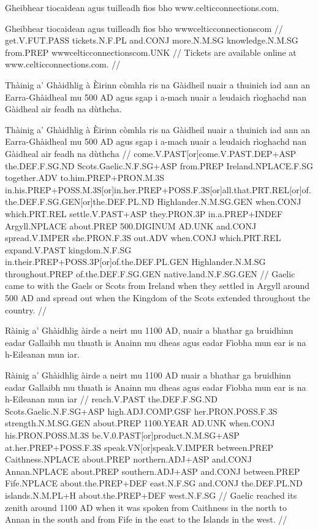\documentclass[a4paper,10pt]{article}
\begin{document}
\ex
\begingl
\glpre Gheibhear tiocaidean agus tuilleadh fios bho www.celticconnections.com. 

\vspace{4mm}
\gla Gheibhear tiocaidean agus tuilleadh fios bho wwwcelticconnectionscom  //
\glb get.V.FUT.PASS tickets.N.F.PL and.CONJ more.N.M.SG knowledge.N.M.SG from.PREP wwwcelticconnectionscom.UNK  //
\glft Tickets are available online at www.celticconnections.com. //
\endgl
\xe

\ex
\begingl
\glpre Thàinig a' Ghàidhlig à Èirinn còmhla ris na Gàidheil nuair a thuinich iad ann an Earra-Ghàidheal mu 500 AD agus sgap i a-mach nuair a leudaich rìoghachd nan Gàidheal air feadh na dùthcha. 

\vspace{4mm}
\gla Thàinig a' Ghàidhlig à Èirinn còmhla ris na Gàidheil nuair a thuinich iad {ann an} Earra-Ghàidheal mu 500 AD agus sgap i a-mach nuair a leudaich rìoghachd nan Gàidheal {air feadh} na dùthcha  //
\glb come.V.PAST[or]come.V.PAST.DEP+ASP the.DEF.F.SG.ND Scots.Gaelic.N.F.SG+ASP from.PREP Ireland.NPLACE.F.SG together.ADV to.him.PREP+PRON.M.3S in.his.PREP+POSS.M.3S[or]in.her.PREP+POSS.F.3S[or]all.that.PRT.REL[or]of.the.DEF.F.SG.GEN[or]the.DEF.PL.ND Highlander.N.M.SG.GEN when.CONJ which.PRT.REL settle.V.PAST+ASP they.PRON.3P in.a.PREP+INDEF Argyll.NPLACE about.PREP 500.DIGINUM AD.UNK and.CONJ spread.V.IMPER she.PRON.F.3S out.ADV when.CONJ which.PRT.REL expand.V.PAST kingdom.N.F.SG in.their.PREP+POSS.3P[or]of.the.DEF.PL.GEN Highlander.N.M.SG throughout.PREP of.the.DEF.F.SG.GEN native.land.N.F.SG.GEN  //
\glft Gaelic came to with the Gaels or Scots from Ireland when they settled in Argyll around 500 AD and spread out when the Kingdom of the Scots extended throughout the country. //
\endgl
\xe

\ex
\begingl
\glpre Ràinig a' Ghàidhlig àirde a neirt mu 1100 AD, nuair a bhathar ga bruidhinn eadar Gallaibh mu thuath is Anainn mu dheas agus eadar Fìobha mun ear is na h-Eileanan mun iar. 

\vspace{4mm}
\gla Ràinig a' Ghàidhlig àirde a neirt mu 1100 AD nuair a bhathar ga bruidhinn eadar Gallaibh mu thuath is Anainn mu dheas agus eadar Fìobha mun ear is na h-Eileanan mun iar  //
\glb reach.V.PAST the.DEF.F.SG.ND Scots.Gaelic.N.F.SG+ASP high.ADJ.COMP.GSF her.PRON.POSS.F.3S strength.N.M.SG.GEN about.PREP 1100.YEAR AD.UNK when.CONJ his.PRON.POSS.M.3S be.V.0.PAST[or]product.N.M.SG+ASP at.her.PREP+POSS.F.3S speak.VN[or]speak.V.IMPER between.PREP Caithness.NPLACE about.PREP northern.ADJ+ASP and.CONJ Annan.NPLACE about.PREP southern.ADJ+ASP and.CONJ between.PREP Fife.NPLACE about.the.PREP+DEF east.N.F.SG and.CONJ the.DEF.PL.ND islands.N.M.PL+H about.the.PREP+DEF west.N.F.SG  //
\glft Gaelic reached its zenith around 1100 AD when it was spoken from Caithness in the north to Annan in the south and from Fife in the east to the Islands in the west. //
\endgl
\xe
\end{document}
